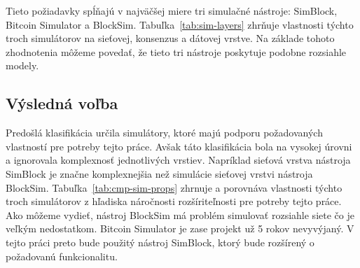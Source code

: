 Tieto požiadavky spĺňajú v najväčšej miere tri simulačné nástroje: SimBlock, Bitcoin Simulator a BlockSim. Tabuľka~\ref{tab:sim-layers} zhrňuje vlastnosti týchto troch simulátorov na sieťovej, konsenzus a dátovej vrstve. Na základe tohoto zhodnotenia môžeme povedať, že tieto tri nástroje poskytuje podobne rozsiahle modely.

\subsection{Výsledná voľba}

Predošlá klasifikácia určila simulátory, ktoré majú podporu požadovaných vlastností pre potreby tejto práce. Avšak táto klasifikácia bola na vysokej úrovni a ignorovala komplexnosť jednotlivých vrstiev. Napríklad sieťová vrstva nástroja SimBlock je značne komplexnejšia než simulácie sieťovej vrstvi nástroja BlockSim. Tabuľka~\ref{tab:cmp-sim-props} zhrnuje a porovnáva vlastnosti týchto troch simulátorov z hľadiska náročnosti rozšíriteľnosti pre potreby tejto práce. Ako môžeme vydieť, nástroj BlockSim má problém simulovať rozsiahle siete čo je veľkým nedostatkom. Bitcoin Simulator je zase projekt už 5 rokov nevyvýjaný. V tejto práci preto bude použitý nástroj SimBlock, ktorý bude rozšírený o požadovanú funkcionalitu. 

\begin{table}[H]
	\caption{Porovnanie vlastností troch najrozsiahlejších simulátorov.}
	\label{tab:cmp-sim-props}
\end{table}


